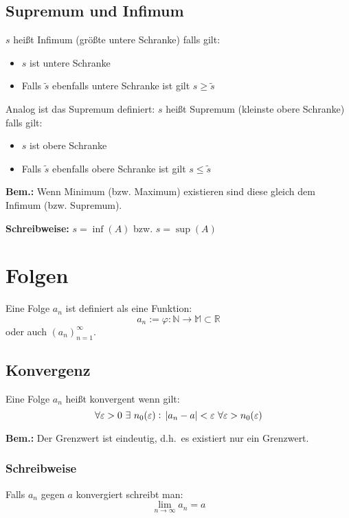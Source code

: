 \documentclass[12pt]{article}
\begin{document}
    \subsection{Supremum und Infimum}
    $s$ heißt Infimum (größte untere Schranke) falls gilt:
    \begin{itemize}
        \item $s$ ist untere Schranke
        \item Falls $\tilde{s}$ ebenfalls untere Schranke ist gilt
        $s\geq\tilde{s}$
    \end{itemize}

     Analog ist das Supremum definiert: $s$ heißt Supremum (kleinste obere Schranke) falls gilt:
    \begin{itemize}
        \item $s$ ist obere Schranke
        \item Falls $\tilde{s}$ ebenfalls obere Schranke ist gilt
        $s\leq\tilde{s}$
    \end{itemize}

    \textbf{Bem.:}
    Wenn Minimum (bzw. Maximum) existieren sind diese gleich dem
    Infimum (bzw. Supremum).

    \textbf{Schreibweise:}
    $s = \inf{(A)}$ bzw. $s = \sup{(A)}$


    \section{Folgen}
    Eine Folge $a_n$ ist definiert als eine Funktion:
    \begin{equation*}
        a_n := \varphi: \mathbb{N} \rightarrow \mathbb{M} \subset \mathbb{R}
    \end{equation*}
    oder auch ${(a_n)}_{n=1}^\infty$.

    \subsection{Konvergenz}
    Eine Folge $a_n$ heißt konvergent wenn gilt:
    \begin{equation*}
        \forall \varepsilon>0\ \exists~n_0(\varepsilon):\ \abs{a_n - a} < \varepsilon\ \forall \varepsilon > n_0(\varepsilon)
    \end{equation*}

    \textbf{Bem.:}
    Der Grenzwert ist eindeutig, d.h.\ es existiert nur ein Grenzwert.

    \subsubsection{Schreibweise}
    Falls $a_n$ gegen $a$ konvergiert schreibt man:
    \begin{equation*}
        \lim_{n \rightarrow \infty} a_n = a
    \end{equation*}
\end{document}
